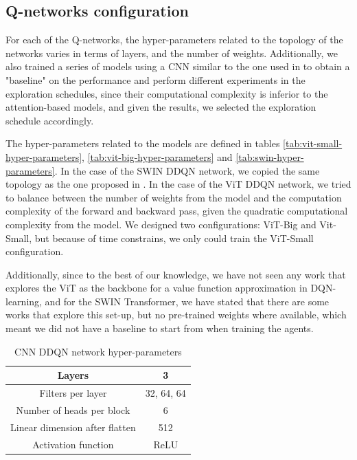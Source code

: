 \subsection{Q-networks configuration}

For each of the Q-networks, the hyper-parameters related to the topology of the networks varies in terms of layers, and the number of weights. Additionally, we also trained a series of models using a CNN similar to the one used in \cite{vanhasselt2015deep} to obtain a "baseline" on the performance and perform different experiments in the exploration schedules, since their computational complexity is inferior to the attention-based models, and given the results, we selected the exploration schedule accordingly.

The hyper-parameters related to the models are defined in tables \ref{tab:vit-small-hyper-parameters}, \ref{tab:vit-big-hyper-parameters} and \ref{tab:swin-hyper-parameters}. In the case of the SWIN DDQN network, we copied the same topology as the one proposed in \cite{meng2024deep}. In the case of the ViT DDQN network, we tried to balance between the number of weights from the model and the computation complexity of the forward and backward pass, given the quadratic computational complexity from the model. We designed two configurations: ViT-Big and Vit-Small, but because of time constrains, we only could train the ViT-Small configuration.

Additionally, since to the best of our knowledge, we have not seen any work that explores the ViT as the backbone for a value function approximation in DQN-learning, and for the SWIN Transformer, we have stated that there are some works that explore this set-up, but no pre-trained weights where available, which meant we did not have a baseline to start from when training the agents.

\begin{table}[!h]
	\begin{center}
		\caption[CNN DDQN network hyper-parameters]{CNN DDQN network hyper-parameters}
		\label{tab:cnn-hyper-parameters}
		\begin{tabular}{||c | c||} 
			\hline
			Layers & 3 \\
			\hline
			Filters per layer & 32, 64, 64 \\
			\hline
			Number of heads per block & 6 \\
			\hline
			Linear dimension after flatten & 512 \\
			\hline
			Activation function & ReLU \\
			\hline
		\end{tabular}
	\end{center}
\end{table}


